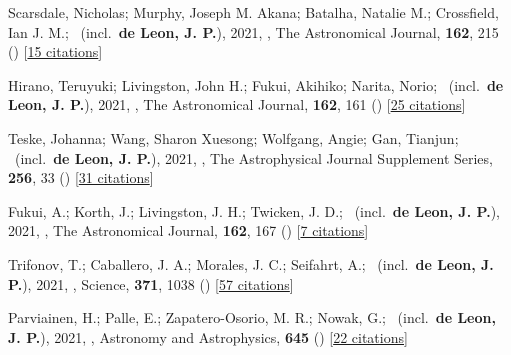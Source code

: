 \item[{\color{numcolor}\scriptsize38}] Scarsdale, Nicholas; Murphy, Joseph M. Akana; Batalha, Natalie M.; Crossfield, Ian J. M.; \etal\ (incl.\ \textbf{de Leon, J. P.}), 2021, , The Astronomical Journal, \textbf{162}, 215 () [\href{https://ui.adsabs.harvard.edu/abs/2021AJ....162..215S}{15 citations}]

\item[{\color{numcolor}\scriptsize37}] Hirano, Teruyuki; Livingston, John H.; Fukui, Akihiko; Narita, Norio; \etal\ (incl.\ \textbf{de Leon, J. P.}), 2021, , The Astronomical Journal, \textbf{162}, 161 () [\href{https://ui.adsabs.harvard.edu/abs/2021AJ....162..161H}{25 citations}]

\item[{\color{numcolor}\scriptsize36}] Teske, Johanna; Wang, Sharon Xuesong; Wolfgang, Angie; Gan, Tianjun; \etal\ (incl.\ \textbf{de Leon, J. P.}), 2021, , The Astrophysical Journal Supplement Series, \textbf{256}, 33 () [\href{https://ui.adsabs.harvard.edu/abs/2021ApJS..256...33T}{31 citations}]

\item[{\color{numcolor}\scriptsize35}] Fukui, A.; Korth, J.; Livingston, J. H.; Twicken, J. D.; \etal\ (incl.\ \textbf{de Leon, J. P.}), 2021, , The Astronomical Journal, \textbf{162}, 167 () [\href{https://ui.adsabs.harvard.edu/abs/2021AJ....162..167F}{7 citations}]

\item[{\color{numcolor}\scriptsize34}] Trifonov, T.; Caballero, J. A.; Morales, J. C.; Seifahrt, A.; \etal\ (incl.\ \textbf{de Leon, J. P.}), 2021, , Science, \textbf{371}, 1038 () [\href{https://ui.adsabs.harvard.edu/abs/2021Sci...371.1038T}{57 citations}]

\item[{\color{numcolor}\scriptsize33}] Parviainen, H.; Palle, E.; Zapatero-Osorio, M. R.; Nowak, G.; \etal\ (incl.\ \textbf{de Leon, J. P.}), 2021, , Astronomy and Astrophysics, \textbf{645} () [\href{https://ui.adsabs.harvard.edu/abs/2021A&A...645A..16P}{22 citations}]

